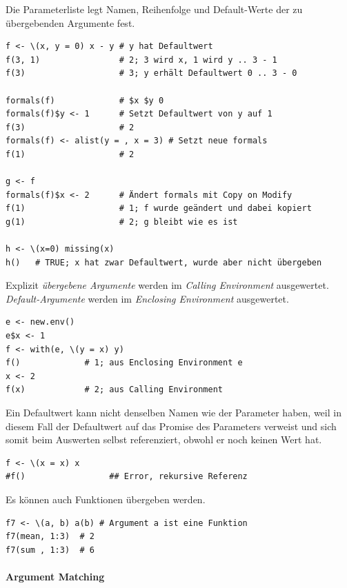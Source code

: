 \documentclass[10pt,twocolumn]{scrartcl}
\begin{document}
Die Parameterliste legt Namen, Reihenfolge und Default-Werte der zu übergebenden Argumente fest.

\begin{lstlisting}
f <- \(x, y = 0) x - y # y hat Defaultwert
f(3, 1)                # 2; 3 wird x, 1 wird y .. 3 - 1
f(3)                   # 3; y erhält Defaultwert 0 .. 3 - 0

formals(f)             # $x $y 0
formals(f)$y <- 1      # Setzt Defaultwert von y auf 1
f(3)                   # 2
formals(f) <- alist(y = , x = 3) # Setzt neue formals
f(1)                   # 2

g <- f
formals(f)$x <- 2      # Ändert formals mit Copy on Modify
f(1)                   # 1; f wurde geändert und dabei kopiert
g(1)                   # 2; g bleibt wie es ist

h <- \(x=0) missing(x)
h()   # TRUE; x hat zwar Defaultwert, wurde aber nicht übergeben
\end{lstlisting}

Explizit \emph{übergebene Argumente} werden im \emph{Calling
Environment} ausgewertet. \emph{Default-Argumente} werden im
\emph{Enclosing Environment} ausgewertet.

\begin{lstlisting}
e <- new.env()
e$x <- 1
f <- with(e, \(y = x) y)
f()             # 1; aus Enclosing Environment e
x <- 2
f(x)            # 2; aus Calling Environment
\end{lstlisting}

Ein Defaultwert kann nicht denselben Namen wie der Parameter haben, weil in diesem Fall der Defaultwert auf das Promise des Parameters verweist und sich somit beim Auswerten selbst referenziert, obwohl er noch keinen Wert hat.

\begin{lstlisting}
f <- \(x = x) x
#f()                 ## Error, rekursive Referenz
\end{lstlisting}

Es können auch Funktionen übergeben werden.

\begin{lstlisting}
f7 <- \(a, b) a(b) # Argument a ist eine Funktion
f7(mean, 1:3)  # 2
f7(sum , 1:3)  # 6
\end{lstlisting}


\paragraph{Argument Matching}
\end{document}
